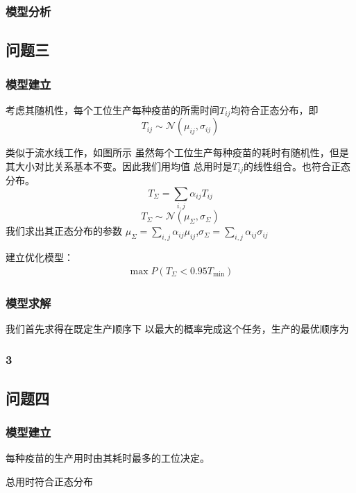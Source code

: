 \documentclass[UTF8]{ctexart}
\begin{document}
	\subsubsection{模型分析}
	
	\subsection{问题三}
	\subsubsection{模型建立}
	考虑其随机性，每个工位生产每种疫苗的所需时间$T_{ij}$均符合正态分布，即
	\begin{equation}
		T_{ij}\sim\mathcal{N}(\mu_{ij},\sigma_{ij})
	\end{equation}
	
	类似于流水线工作，如图所示
	虽然每个工位生产每种疫苗的耗时有随机性，但是其大小对比关系基本不变。因此我们用均值
	总用时是$T_{ij}$的线性组合。也符合正态分布。
	\begin{equation}
		T_{\Sigma}=\sum_{i,j}\alpha_{ij}T_{ij}
	\end{equation}
	\begin{equation}
		T_{\Sigma}\sim\mathcal{N}(\mu_{\Sigma},\sigma_{\Sigma})
	\end{equation}
	我们求出其正态分布的参数
	$\mu_{\Sigma}=\sum_{i,j}\alpha_{ij}\mu_{ij}$,$\sigma_{\Sigma}=\sum_{i,j}\alpha_{ij}\sigma_{ij}$
	\par 建立优化模型：
	\begin{equation}
	\begin{split}
		\max P(T_{\Sigma}<0.95T_{\min})
	\end{split}
	\end{equation}
	\subsubsection{模型求解}
	我们首先求得在既定生产顺序下
	以最大的概率完成这个任务，生产的最优顺序为
	\subsubsection{3}
	
	\subsection{问题四}
	\subsubsection{模型建立}
	每种疫苗的生产用时由其耗时最多的工位决定。
	\par 总用时符合正态分布
\end{document}
